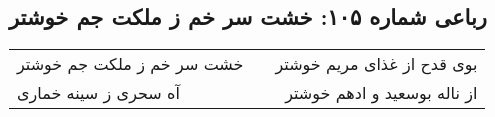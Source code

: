 \begin{center}
\section*{رباعی شماره ۱۰۵: خشت سر خم ز ملکت جم خوشتر}
\label{sec:sh105}
\begin{longtable}{l p{0.5cm} r}
خشت سر خم ز ملکت جم خوشتر
&&
بوی قدح از غذای مریم خوشتر
\\
آه سحری ز سینه خماری
&&
از ناله بوسعید و ادهم خوشتر
\\
\end{longtable}
\end{center}
